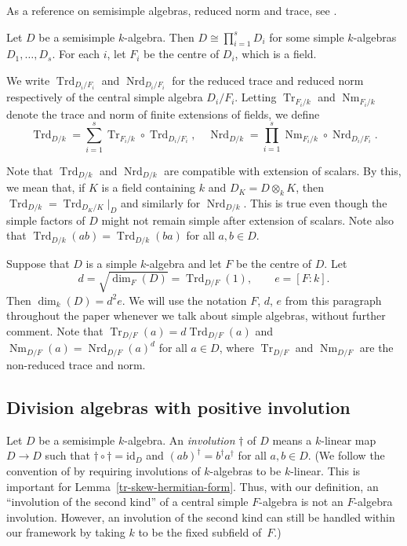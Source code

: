 \documentclass[11pt]{article}
\numberwithin{equation}{section}
\DeclareMathOperator{\Nm}{Nm}
\DeclareMathOperator{\Nrd}{Nrd}
\DeclareMathOperator{\Tr}{Tr}
\DeclareMathOperator{\Trd}{Trd}
\newcommand{\id}{\mathrm{id}}
\newcommand{\defterm}[1]{\emph{#1}}
\begin{document}
As a reference on semisimple algebras, reduced norm and trace, see \cite[\S9]{Rei75}.

Let $D$ be a semisimple $k$-algebra.
Then $D \cong \prod_{i=1}^s D_i$ for some simple $k$-algebras $D_1, \dotsc, D_s$.
For each $i$, let $F_i$ be the centre of $D_i$, which is a field.

We write $\Trd_{D_i/F_i}$ and $\Nrd_{D_i/F_i}$ for the reduced trace and reduced norm respectively of the central simple algebra $D_i/F_i$.
Letting $\Tr_{F_i/k}$ and $\Nm_{F_i/k}$ denote the trace and norm of finite extensions of fields, we define\vspace*{-3pt}
\[
\Trd_{D/k} = \sum_{i=1}^s \Tr_{F_i/k} \circ \Trd_{D_i/F_i}, \quad \Nrd_{D/k} = \prod_{i=1}^s \Nm_{F_i/k} \circ \Nrd_{D_i/F_i}.
\]

Note that $\Trd_{D/k}$ and $\Nrd_{D/k}$ are compatible with extension of scalars.
By this, we mean that, if $K$ is a field containing $k$ and $D_K = D \otimes_k K$, then $\Trd_{D/k} = \Trd_{D_K/K}|_D$ and similarly for $\Nrd_{D/k}$.
This is true even though the simple factors of $D$ might not remain simple after extension of scalars.
Note also that $\Trd_{D/k}(ab) = \Trd_{D/k}(ba)$ for all $a, b \in D$.

Suppose that $D$ is a simple $k$-algebra and let $F$ be the centre of $D$.
Let\vspace*{-3pt}
\[
d = \sqrt{\dim_F(D)} = \Trd_{D/F}(1), \qquad e = [F:k].
\]
Then $\dim_k(D) = d^2e$.
We will use the notation $F$, $d$, $e$ from this paragraph throughout the paper whenever we talk about simple algebras, without further comment.
Note that $\Tr_{D/F}(a) = d\Trd_{D/F}(a)$ and $\Nm_{D/F}(a) = \Nrd_{D/F}(a)^d$ for all $a \in D$, where $\Tr_{D/F}$ and $\Nm_{D/F}$ are the non-reduced trace and norm.

\subsection{Division algebras with positive involution} \label{subsec:albert}

Let $D$ be a semisimple $k$\nobreakdash-alge\-bra.
An \defterm{involution} $\dag$ of $D$ means a $k$-linear map $D \to D$ such that $\dag \circ \dag = \id_D$ and $(ab)^\dag = b^\dag a^\dag$ for all $a,b \in D$.
(We follow the convention of \cite[\S8]{Mil05} by requiring involutions of $k$-algebras to be $k$-linear. This is important for Lemma~\ref{tr-skew-hermitian-form}. Thus, with our definition, an ``involution of the second kind'' of a central simple $F$-algebra is not an $F$-algebra involution. However, an involution of the second kind can still be handled within our framework by taking $k$ to be the fixed subfield of~$F$.)
\end{document}
